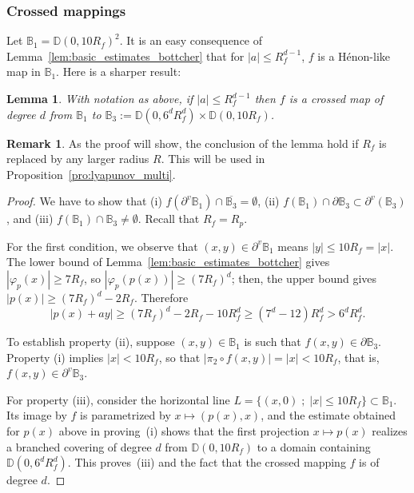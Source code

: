 \documentclass[oneside, 12pt]{amsart}
\newcommand{\disk}{\mathbb{D}}
\newcommand{\fr}{\partial}
\newcommand{\abs}[1]{\left\vert#1\right\vert}
\newcommand{\bb}{\mathbb{B}}
\theoremstyle{plain}
\newtheorem{lem}[thm]{Lemma}
\theoremstyle{definition}
\newtheorem{rem}[thm]{Remark}
\numberwithin{equation}{section}       %
\numberwithin{equation}{section}       %
\begin{document}
\subsubsection{Crossed mappings}\label{subsub:crossed} 
Let $\bb_1 = \disk(0, 10 R_f)^2$.  
It is an easy consequence of Lemma~\ref{lem:basic_estimates_bottcher}
that for $\abs{a}\leq R_f^{d-1}$,  $f$ is a Hénon-like map in $\bb_1$. Here is a  sharper result:

\begin{lem}\label{lem:crossed}
With notation as above, if $\abs{a}\leq R_f^{d-1}$ then $f$ is a crossed map of degree $d$ from 
$\bb_1$ to $\bb_3:= \disk(0, 6^dR_f^d)\times \disk(0, 10R_f)$. 
\end{lem}

\begin{rem}
\label{rem:largerR}
As the proof will show, the conclusion of the lemma hold if $R_f$ is replaced by any larger radius $R$. This will be used in Proposition~\ref{pro:lyapunov_multi}.
\end{rem}

\begin{proof}
We have to show that  
 (i) $f(\fr^v\bb_1)\cap \overline{\bb_3} = \emptyset$, 
(ii) $f(\bb_1) \cap \fr\bb_3\subset \fr^v(\bb_3)$, 
and (iii)  $f(\bb_1)\cap  {\bb_3} \neq\emptyset$. Recall that  $R_f = R_p$.

For the first condition, we observe that $(x,y)\in \fr^v\bb_1$ means 
$\abs{y}\leq 10R_f=\abs{x}$. 
The lower bound of Lemma~\ref{lem:basic_estimates_bottcher} gives  
$\abs{\varphi_p(x)}\geq 7 R_f$, so  $\abs{\varphi_p(p(x))}\geq (7R_f)^d$; then, the upper bound gives
$\abs{p(x)}\geq (7R_f)^d- 2R_f $. Therefore 
\begin{equation}
\abs{p(x) +ay}\geq (7R_f)^d - 2R_f - 10R_f^d \geq (7^d- 12)R_f^d > 6^dR_f^d.
\end{equation} 

To establish property (ii), suppose $(x,y)\in \bb_1$ is such that  $f(x,y) \in \fr\bb_3$. Property (i) implies $\abs{x}< 10R_f$, 
so that  $\abs{ \pi_2\circ f (x,y) }=\abs{x}< 10R_f$, that is, $f(x,y)\in \fr^v\bb_3$. 

For  property (iii), consider the horizontal line $L=\{(x,0)\; ; \;  \abs{x}\leq 10 R_f\}\subset \bb_1$.
Its image by $f$ is parametrized by $x\mapsto (p(x),x)$, and the estimate obtained for $p(x)$ above in proving~(i) shows that 
the first projection $x\mapsto p(x)$  realizes a branched covering of degree $d$ from $\disk(0, 10R_f)$ 
to a domain containing $\disk(0, 6^d R_f^d)$. This proves~(iii) and the fact that the crossed mapping 
 $f$ is of degree $d$. 
\end{proof}
\end{document}
